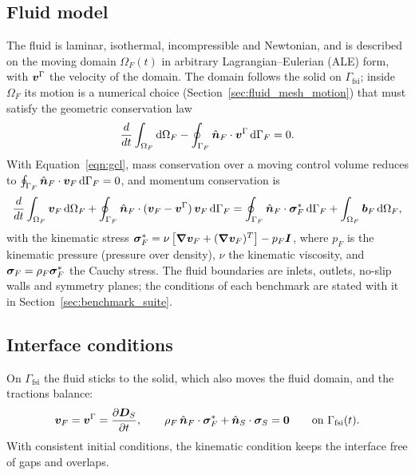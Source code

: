 \subsection{Fluid model}
\label{sec:fluid_governing_eqn}

The fluid is laminar, isothermal, incompressible and Newtonian, and is described on the moving domain $\Omega_F(t)$ in arbitrary Lagrangian--Eulerian (ALE) form, with $\boldsymbol{v}^\Gamma$ the velocity of the domain.
The domain follows the solid on $\Gamma_\text{fsi}$; inside $\Omega_F$ its motion is a numerical choice (Section~\ref{sec:fluid_mesh_motion}) that must satisfy the geometric conservation law
\begin{equation}
    \frac{d}{dt} \int_{\Omega_F} \text{d}\Omega_F - \oint_{\Gamma_F} \hat{\boldsymbol{n}}_F \cdot \boldsymbol{v}^\Gamma \, \text{d}\Gamma_F = 0 .
    \label{eqn:gcl}
\end{equation}
With Equation~\eqref{eqn:gcl}, mass conservation over a moving control volume reduces to $\oint_{\Gamma_F} \hat{\boldsymbol{n}}_F \cdot \boldsymbol{v}_F \, \text{d}\Gamma_F = 0$, and momentum conservation is
\begin{equation}
    \frac{d}{dt} \int_{\Omega_F} \boldsymbol{v}_F \, \text{d}\Omega_F
    + \oint_{\Gamma_F} \hat{\boldsymbol{n}}_F \cdot (\boldsymbol{v}_F - \boldsymbol{v}^\Gamma)\, \boldsymbol{v}_F \, \text{d}\Gamma_F
    = \oint_{\Gamma_F} \hat{\boldsymbol{n}}_F \cdot \boldsymbol{\sigma}_F^* \, \text{d}\Gamma_F
    + \int_{\Omega_F} \boldsymbol{b}_F \, \text{d}\Omega_F,
    \label{eqn:fluid_momentum_ale}
\end{equation}
with the kinematic stress $\boldsymbol{\sigma}_F^* = \nu\left[\boldsymbol{\nabla}\boldsymbol{v}_F + (\boldsymbol{\nabla}\boldsymbol{v}_F)^T\right] - p_F \boldsymbol{I}$, where $p_F$ is the kinematic pressure (pressure over density), $\nu$ the kinematic viscosity, and $\boldsymbol{\sigma}_F = \rho_F \boldsymbol{\sigma}_F^*$ the Cauchy stress.
The fluid boundaries are inlets, outlets, no-slip walls and symmetry planes; the conditions of each benchmark are stated with it in Section~\ref{sec:benchmark_suite}.

\subsection{Interface conditions}
\label{sec:fsi_interface}

On $\Gamma_\text{fsi}$ the fluid sticks to the solid, which also moves the fluid domain, and the tractions balance:
\begin{equation}
    \boldsymbol{v}_F = \boldsymbol{v}^\Gamma = \frac{\partial \boldsymbol{D}_S}{\partial t},
    \qquad
    \rho_F \, \hat{\boldsymbol{n}}_F \cdot \boldsymbol{\sigma}_F^* + \hat{\boldsymbol{n}}_S \cdot \boldsymbol{\sigma}_S = \boldsymbol{0}
    \qquad \text{on } \Gamma_\text{fsi}(t).
    \label{eqn:kinematic_interface}
\end{equation}
With consistent initial conditions, the kinematic condition keeps the interface free of gaps and overlaps.
